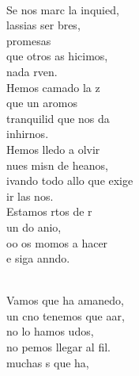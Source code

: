 \begin{cancion}%
	       \chord{(}{**)}{    }\\
	Se nos marc la inquied, \\
	lassias  ser bres,\\
	promesas\\
	que otros as hicimos,\\
	 nada rven.\\
	Hemos camado la z\\
	que un aromos\\
	  tranquilid que nos da\\
	 inhirnos.\\
	Hemos lledo a olvir\\
	nues misn de heanos, \\
	ivando todo allo que exige\\
	ir las nos.\\
	Estamos rtos de r\\
	un do anio,\\
	oo os momos a hacer\\
	e siga anndo.\\\jump\\
	\begin{chorus}%
	Vamos que  ha amanedo,\\
	un cno tenemos que aar,\\
	no lo hamos udos,\\
	no pemos llegar al fil.\\
	 muchas s que ha,\\

\end{chorus}
\end{cancion}
